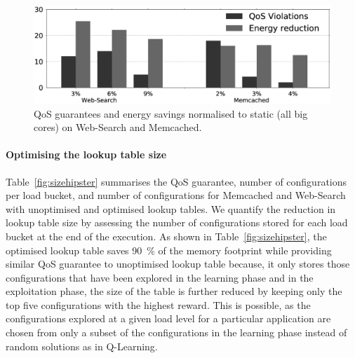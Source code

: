 \begin{figure}[t]
\centering
\includegraphics[width=0.95\linewidth]{Chapter4/Figs/bucketsize-qos-power.eps}
    \caption[Impact of bucket size on HipsterIn]{ QoS guarantees and energy savings normalised to static (all big cores) on Web-Search and Memcached.}
\label{fig:loadbucket-qos-websearch}
\end{figure}

\paragraph*{Optimising the lookup table size} Table~\ref{fig:sizehipster} summarises the
QoS guarantee, number of configurations per load bucket, and number of configurations for
Memcached and Web-Search with unoptimised and optimised lookup tables. We quantify the
reduction in lookup table size by assessing the number of configurations stored for each
load bucket at the end of the execution. As shown in Table~\ref{fig:sizehipster}, the
optimised lookup table saves \SI{90}{\percent} of the memory footprint while providing
similar QoS guarantee to unoptimised lookup table because, it only stores those
configurations that have been explored in the learning phase and in the exploitation
phase, the size of the table is further reduced by keeping only the top five
configurations with the highest reward. This is possible, as the configurations explored
at a given load level for a particular application are chosen from only a subset of the
configurations in the learning phase instead of random solutions as in Q-Learning.

